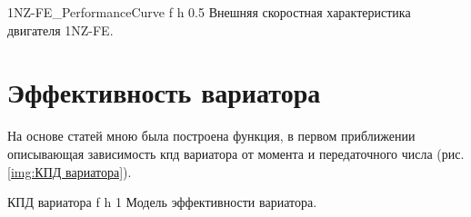     {1NZ-FE_PerformanceCurve} %
    {f} %
    {h} %
    {0.5\textwidth} %
    {Внешняя скоростная характеристика двигателя 1NZ-FE.} %

\section{Эффективность вариатора}

На основе статей мною была построена функция, в первом приближении описывающая зависимость кпд вариатора от момента и передаточного числа (рис. \ref{img:КПД вариатора}).

    {КПД вариатора} %
    {f} %
    {h} %
    {1\textwidth} %
    {Модель эффективности вариатора.} %